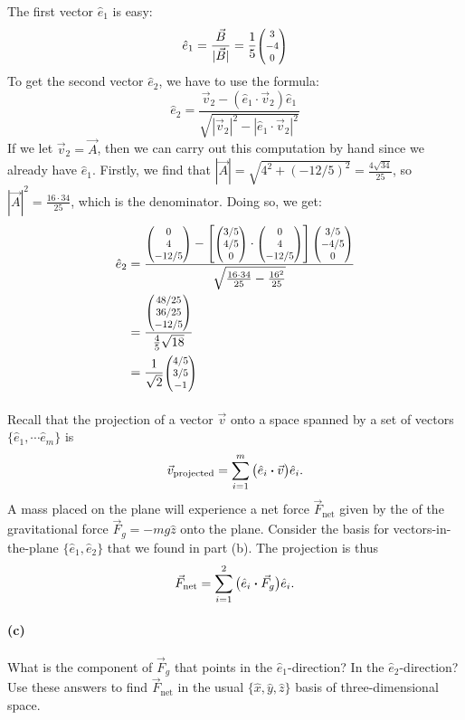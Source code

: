 \documentclass{article}
\begin{document}
\begin{solution}
    The first vector $\hat e_1$ is easy:
    \[ \hat e_1 = \frac{\vec B}{|\vec B|} = \frac{1}{5}\smthreevect{3}{-4}{0}\]
    To get the second vector $\hat e_2$, we have to use the formula: 
    \[ \hat e_2 = \frac{\vec v_2 - (\hat e_1 \cdot \vec v_2) \hat e_1}{\sqrt{|\vec v_2|^2 - |\hat e_1 \cdot \vec v_2|^2}}\]
    If we let $\vec v_2 = \vec A$, then we can carry out this computation by hand since we already have $\hat e_1$. Firstly, we find that $|\vec A| = \sqrt{4^2 + (-12/5)^2} = \frac{4\sqrt{34}}{25}$, so $|\vec A|^2 = \frac{16\cdot 34}{25}$, which is the denominator. Doing so, we get:
    \begin{align*}
        \hat e_2 &= \frac{\smthreevect{0}{4}{-12/5} - \left[\smthreevect{3/5}{4/5}{0} \cdot \smthreevect{0}{4}{-12/5}\right]\smthreevect{3/5}{-4/5}{0}}{\sqrt{\frac{16 \cdot 34}{25} - \frac{16^2}{25}}}\\
        &= \frac{\smthreevect{48/25}{36/25}{-12/5}}{\frac 45 \sqrt{18}}\\
        &= \frac{1}{\sqrt{2}}\smthreevect{4/5}{3/5}{-1}
    \end{align*}
\end{solution}


\phline
\paragraph{}
Recall that the projection of a vector $\vec{v}$ onto a space spanned by a set of vectors $\{\hat{e}_{1},\cdots \hat{e}_{m}\}$ is
	\begin{equation*}
		\vec{v}_{\textrm{projected}} = \sum_{i=1}^{m} \big(\hat{e}_{i}\boldsymbol{\cdot}\vec{v}\big)\hat{e}_{i}.
	\end{equation*}
A mass placed on the plane will experience a net force $\vec{F}_{\textrm{net}}$ given by the  of the gravitational force 
$\vec{F}_{g} = -mg\hat{z}$ onto the plane. 
Consider the basis for vectors-in-the-plane $\{\hat{e}_{1},\hat{e}_{2}\}$ that we found in part (b).  The projection is thus
	\begin{equation*}
		\vec{F}_{\textrm{net}} = \sum_{i=1}^{2}\big(\hat{e}_{i}\boldsymbol{\cdot}\vec{F}_{g}\big)\hat{e}_{i}.
	\end{equation*}


\paragraph{(c)}
What is the component of $\vec{F}_{g}$ that points in the $\hat{e}_{1}$-direction?  In the $\hat{e}_{2}$-direction?  Use these answers to find $\vec{F}_{\textrm{net}}$ in 
the usual $\{\hat{x},\hat{y},\hat{z}\}$ basis of three-dimensional space.
\end{document}
